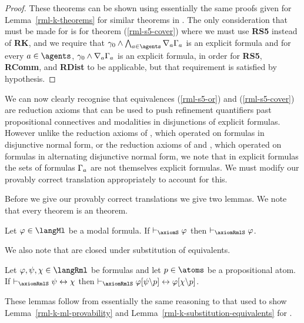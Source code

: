 \begin{proof}
These theorems can be shown using essentially the same proofs given for Lemma~\ref{rml-k-theorems} for similar theorems in \axiomRmlK{}.
The only consideration that must be made for \axiomRmlS{} is for theorem (\ref{rml-s5-cover}) where we must use {\bf RS5} instead of {\bf RK}, 
and we require that $\gamma_0 \land \bigwedge_{\agentA \in \agents} \coversA \Gamma_\agentA$ is an explicit formula and for every $\agentA \in \agents$, $\gamma_0 \land \nabla_{a} \Gamma_a$ is an explicit formula, in order for {\bf RS5}, {\bf RComm}, and {\bf RDist} to be applicable, but that requirement is satisfied by hypothesis.
\end{proof}

We can now clearly recognise that equivalences (\ref{rml-s5-or}) and (\ref{rml-s5-cover}) are reduction axioms that can be used to push refinement quantifiers past propositional connectives and modalities in disjunctions of explicit formulas.
However unlike the reduction axioms of \logicRmlK{}, which operated on formulas in disjunctive normal form, or the reduction axioms of \logicRmlKFF{} and \logicRmlKD{}, which operated on formulas in alternating disjunctive normal form, we note that in explicit formulas the sets of formulas $\Gamma_a$ are not themselves explicit formulas.
We must modify our provably correct translation appropriately to account for this.

Before we give our provably correct translations we give two lemmas.
We note that every \axiomS{} theorem is an \axiomRmlS{} theorem.

\begin{lemma}\label{rml-s5-ml-provability}
Let $\phi \in \langMl$ be a modal formula.
If $\proves_\axiomS \phi$ then $\proves_\axiomRmlS \phi$.
\end{lemma}

We also note that \axiomRmlS{} are closed under substitution of equivalents.

\begin{lemma}\label{rml-s5-substitution-equivalents}
Let $\phi, \psi, \chi \in \langRml$ be formulas and let $\atomP \in \atoms$ be a propositional atom.
If $\proves_\axiomRmlS \psi \iff \chi$ then $\proves_\axiomRmlS \phi[\psi\backslash\atomP] \iff \phi[\chi\backslash\atomP]$.
\end{lemma}

These lemmas follow from essentially the same reasoning to that used to show Lemma~\ref{rml-k-ml-provability} and Lemma~\ref{rml-k-substitution-equivalents} for \axiomRmlK{}.

